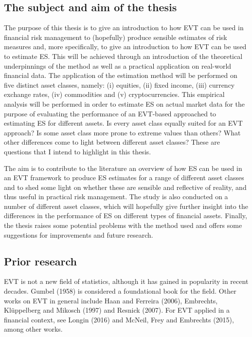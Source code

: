 \documentclass[a4paper,11pt]{article}
\theoremstyle{definition}
\theoremstyle{definition}
\theoremstyle{definition}
\theoremstyle{definition}
\theoremstyle{remark}
\begin{document}
\hypertarget{the-subject-and-aim-of-the-thesis}{%
\subsection{The subject and aim of the thesis}\label{the-subject-and-aim-of-the-thesis}}

The purpose of this thesis is to give an introduction to how EVT can be used in financial risk management to (hopefully) produce sensible estimates of risk measures and, more specifically, to give an introduction to how EVT can be used to estimate ES. This will be achieved through an introduction of the theoretical underpinnings of the method as well as a practical application on real-world financial data. The application of the estimation method will be performed on five distinct asset classes, namely: (i) equities, (ii) fixed income, (iii) currency exchange rates, (iv) commodities and (v) cryptocurrencies. This empirical analysis will be performed in order to estimate ES on actual market data for the purpose of evaluating the performance of an EVT-based approached to estimating ES for different assets. Is every asset class equally suited for an EVT approach? Is some asset class more prone to extreme values than others? What other differences come to light between different asset classes? These are questions that I intend to highlight in this thesis.

The aim is to contribute to the literature an overview of how ES can be used in an EVT framework to produce ES estimates for a range of different asset classes and to shed some light on whether these are sensible and reflective of reality, and thus useful in practical risk management. The study is also conducted on a number of different asset classes, which will hopefully give further insight into the differences in the performance of ES on different types of financial assets. Finally, the thesis raises some potential problems with the method used and offers some suggestions for improvements and future research.

\hypertarget{prior-research}{%
\subsection{Prior research}\label{prior-research}}

EVT is not a new field of statistics, although it has gained in popularity in recent decades. Gumbel (1958) is considered a foundational book for the field. Other works on EVT in general include Haan and Ferreira (2006), Embrechts, Klüppelberg and Mikosch (1997) and Resnick (2007). For EVT applied in a financial context, see Longin (2016) and McNeil, Frey and Embrechts (2015), among other works.
\end{document}
